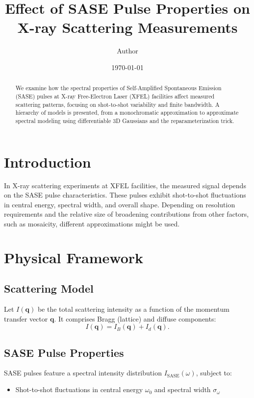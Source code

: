 \documentclass[12pt,a4paper]{article}
\title{Effect of SASE Pulse Properties on X-ray Scattering Measurements}
\author{Author}
\date{\today}
\begin{document}
\maketitle

\begin{abstract}
We examine how the spectral properties of Self-Amplified Spontaneous Emission (SASE) pulses at X-ray Free-Electron Laser (XFEL) facilities affect measured scattering patterns, focusing on shot-to-shot variability and finite bandwidth. A hierarchy of models is presented, from a monochromatic approximation to approximate spectral modeling using differentiable 3D Gaussians and the reparameterization trick.
\end{abstract}

\section{Introduction}
In X-ray scattering experiments at XFEL facilities, the measured signal depends on the SASE pulse characteristics. These pulses exhibit shot-to-shot fluctuations in central energy, spectral width, and overall shape. Depending on resolution requirements and the relative size of broadening contributions from other factors, such as mosaicity, different approximations might be used.

\section{Physical Framework}

\subsection{Scattering Model}
Let $I(\mathbf{q})$ be the total scattering intensity as a function of the momentum transfer vector $\mathbf{q}$. It comprises Bragg (lattice) and diffuse components:
\begin{equation}
I(\mathbf{q}) = I_B(\mathbf{q}) + I_d(\mathbf{q}).
\end{equation}

\subsection{SASE Pulse Properties}
SASE pulses feature a spectral intensity distribution $I_{\text{SASE}}(\omega)$, subject to:
\begin{itemize}
    \item Shot-to-shot fluctuations in central energy $\omega_0$ and spectral width $\sigma_\omega$
\end{itemize}
\end{document}

